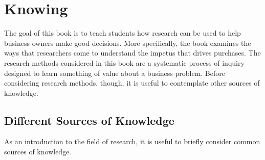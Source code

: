 \section{Knowing}
The goal of this book is to teach students how research can be used to help business owners make good decisions. More specifically, the book examines the ways that researchers come to understand the impetus that drives purchases. The research methods considered in this book are a systematic process of inquiry designed to learn something of value about a business problem. Before considering research methods, though, it is useful to contemplate other sources of knowledge.

\subsection{Different Sources of Knowledge}

As an introduction to the field of research, it is useful to briefly consider common sources of knowledge. 

